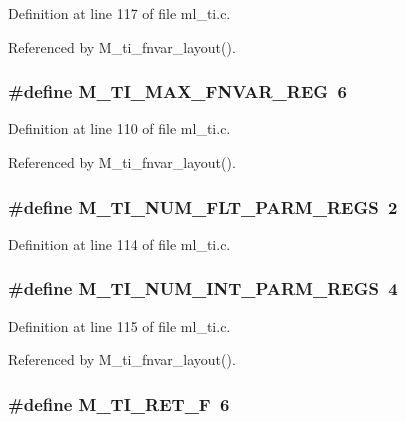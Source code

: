 Definition at line 117 of file ml\_\-ti.c.

Referenced by M\_\-ti\_\-fnvar\_\-layout().
\subsubsection{\setlength{\rightskip}{0pt plus 5cm}\#define M\_\-TI\_\-MAX\_\-FNVAR\_\-REG~6}\label{ml__ti_8c_0d053bc0360713019362939cd89f396d}




Definition at line 110 of file ml\_\-ti.c.

Referenced by M\_\-ti\_\-fnvar\_\-layout().
\subsubsection{\setlength{\rightskip}{0pt plus 5cm}\#define M\_\-TI\_\-NUM\_\-FLT\_\-PARM\_\-REGS~2}\label{ml__ti_8c_3b5a3ab0f198cbc609d6011f03a6a5ef}




Definition at line 114 of file ml\_\-ti.c.
\subsubsection{\setlength{\rightskip}{0pt plus 5cm}\#define M\_\-TI\_\-NUM\_\-INT\_\-PARM\_\-REGS~4}\label{ml__ti_8c_ae3a867657a909fff645288b974f74c3}




Definition at line 115 of file ml\_\-ti.c.

Referenced by M\_\-ti\_\-fnvar\_\-layout().
\subsubsection{\setlength{\rightskip}{0pt plus 5cm}\#define M\_\-TI\_\-RET\_\-F~6}\label{ml__ti_8c_0d47f267ddcbd57ea28c0ddc5c657734}




